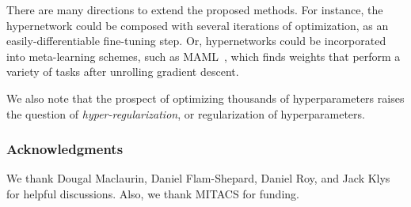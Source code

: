 \documentclass{article} %
\begin{document}
There are many directions to extend the proposed methods.
For instance, the hypernetwork could be composed with several iterations of optimization, as an easily-differentiable fine-tuning step.
Or, hypernetworks could be incorporated into meta-learning schemes, such as MAML~\citep{finn2017model}, which finds weights that perform a variety of tasks after unrolling gradient descent.

We also note that the prospect of optimizing thousands of hyperparameters raises the question of \emph{hyper-regularization}, or regularization of hyperparameters.
%


\subsubsection*{Acknowledgments}
We thank Dougal Maclaurin, Daniel Flam-Shepard, Daniel Roy, and Jack Klys for helpful discussions.
Also, we thank MITACS for funding.
\end{document}
